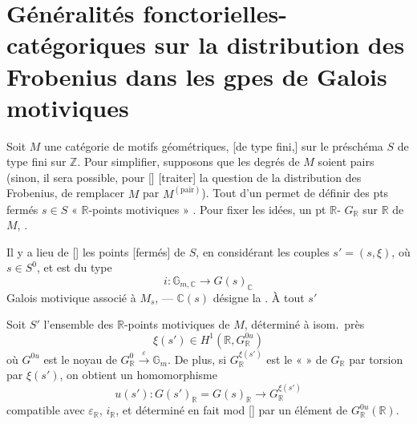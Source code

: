 \documentclass[11pt,a4paper]{article}
\begin{document}
\section{Généralités fonctorielles-catégoriques sur la distribution des
Frobenius dans les gpes de Galois motiviques}


Soit $M$ une catégorie de motifs géométriques, [de type fini,] sur le
préschéma $S$ de type fini sur $\mathbb{Z}$. Pour simplifier, supposons que
les degrés de $M$ soient pairs (sinon, il sera possible, pour
[] \struck{\ill{}} [traiter] la question de la
distribution des Frobenius, de remplacer $M$ par $M^{(\mathrm{pair})}$).
Tout  d'un \ill{} permet de définir des pts fermés
$s \in S$ \ill{} « $\mathbb{R}$-points motiviques » 
\ill{} \ill{}. Pour fixer les idées, \ill{} \ill{} un pt
$\mathbb{R}$- \ill{} \ill{} 
$G_{\mathbb{R}}$ sur $\mathbb{R}$ de $M$, \ill{} \ill{} \ill{}.

Il y a lieu de \struck{\ill{}} [] les points
[fermés] de $S$, en considérant les couples $s' = (s, \xi)$, où
$s \in S^{0}$, et \ill{} \struck{\ill{}}  \ill{}
est du type
\[
  i : \mathbb{G}_{m,\mathbb{C}} \to G(s)_{\mathbb{C}}
\]
\ill{} Galois motivique associé à $M_s$, --- $\mathbb{C}(s)$ désigne la
\ill{} \ill{} \ill{} . À tout $s'$ \ill{}


 Soit $S'$ l'ensemble des $\mathbb{R}$-points motiviques de
$M$,  \ill{} \ill{} déterminé à isom.\ près \struck{\ill{}}
\[
  \xi(s') \in H^{1}(\mathbb{R}, G^{0u}_{\mathbb{R}})
\]
où $G^{0u}$ est le noyau de $G^{0}_{\mathbb{R}}
\xrightarrow{\ \varepsilon\ } \mathbb{G}_m$. De plus, si
$G_{\mathbb{R}}^{\xi(s')}$ est le «  » \ill{} de
$G_{\mathbb{R}}$ par torsion par $\xi(s')$, on obtient \ill{} un
homomorphisme \ill{}
\[
  u(s') : G(s')_{\mathbb{R}} = G(s)_{\mathbb{R}} \longrightarrow
  G_{\mathbb{R}}^{\xi(s')}
\]
compatible avec $\varepsilon_{\mathbb{R}}$, $i_{\mathbb{R}}$, et déterminé
en fait mod  [\ill{}] par un élément de
$G^{0u}_{\mathbb{R}}(\mathbb{R})$.
\end{document}
